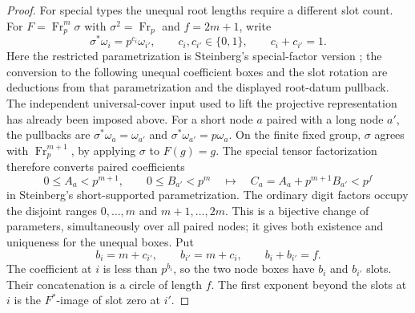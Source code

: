 \begin{proof}
For special types the unequal root lengths require a different slot count.
For $F=\operatorname{Fr}_p^m\sigma$ with
$\sigma^2=\operatorname{Fr}_p$ and $f=2m+1$, write
\begin{equation}\label{q:special-slot-data}
 \sigma^*\omega_i=p^{c_i}\omega_{i'},\qquad
 c_i,c_{i'}\in\{0,1\},\qquad c_i+c_{i'}=1.
\end{equation}
Here the restricted parametrization is Steinberg's special-factor
version \citep[Sections~11--12, especially Theorem~12.2]{Steinberg1963};
the conversion to the following unequal coefficient boxes and the slot
rotation are deductions from that parametrization and the displayed
root-datum pullback.  The independent universal-cover input used to
lift the projective representation has already been imposed above.
For a short node $a$ paired with a long node $a'$, the pullbacks are
$\sigma^*\omega_a=\omega_{a'}$ and
$\sigma^*\omega_{a'}=p\omega_a$.  On the finite fixed group,
$\sigma$ agrees with $\operatorname{Fr}_p^{m+1}$, by applying $\sigma$
to $F(g)=g$.  The special tensor factorization therefore converts
paired coefficients
\[
 0\le A_a<p^{m+1},\qquad 0\le B_{a'}<p^m
 \quad\longmapsto\quad C_a=A_a+p^{m+1}B_{a'}<p^f
\]
in Steinberg's short-supported parametrization.  The ordinary digit
factors occupy the disjoint ranges $0,\ldots,m$ and $m+1,\ldots,2m$.
This is a bijective change of parameters, simultaneously over all
paired nodes; it gives both existence and uniqueness for the unequal
boxes.  Put
\[
 b_i=m+c_{i'},\qquad b_{i'}=m+c_i,\qquad b_i+b_{i'}=f.
\]
The coefficient at $i$ is less than $p^{b_i}$, so the two node boxes
have $b_i$ and $b_{i'}$ slots.  Their concatenation is a circle of
length $f$.  The first exponent beyond the slots at $i$ is the
$F^*$-image of slot zero at $i'$.


\end{proof}
